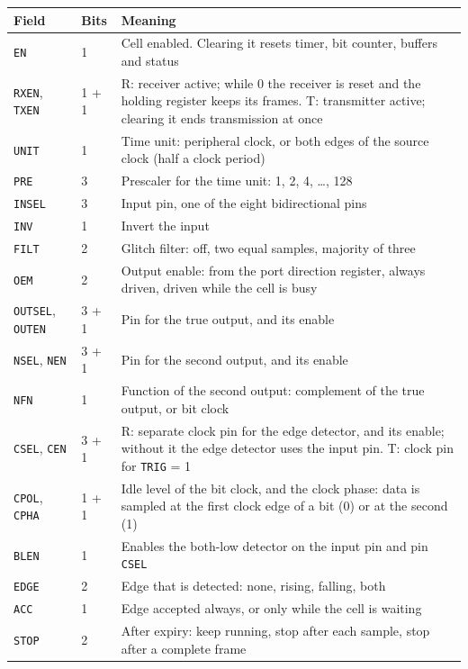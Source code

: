 \documentclass[10pt,a4paper]{article}
\newcommand{\reg}[1]{\texttt{#1}}
\begin{document}
\begin{table}[H]
\centering\small
\begin{tabularx}{\linewidth}{@{}llL@{}}
\toprule
Field & Bits & Meaning \\
\midrule
\reg{EN} & 1 & Cell enabled. Clearing it resets timer, bit counter, buffers and status \\
\reg{RXEN}, \reg{TXEN} & 1 + 1 & R: receiver active; while 0 the receiver is reset and the holding register keeps its frames. T: transmitter active; clearing it ends transmission at once \\
\reg{UNIT} & 1 & Time unit: peripheral clock, or both edges of the source clock (half a clock period) \\
\reg{PRE} & 3 & Prescaler for the time unit: 1, 2, 4, \dots, 128 \\
\midrule
\reg{INSEL} & 3 & Input pin, one of the eight bidirectional pins \\
\reg{INV} & 1 & Invert the input \\
\reg{FILT} & 2 & Glitch filter: off, two equal samples, majority of three \\
\reg{OEM} & 2 & Output enable: from the port direction register, always driven, driven while the cell is busy \\
\reg{OUTSEL}, \reg{OUTEN} & 3 + 1 & Pin for the true output, and its enable \\
\reg{NSEL}, \reg{NEN} & 3 + 1 & Pin for the second output, and its enable \\
\reg{NFN} & 1 & Function of the second output: complement of the true output, or bit clock \\
\reg{CSEL}, \reg{CEN} & 3 + 1 & R: separate clock pin for the edge detector, and its enable; without it the edge detector uses the input pin. T: clock pin for \reg{TRIG} = 1 \\
\reg{CPOL}, \reg{CPHA} & 1 + 1 & Idle level of the bit clock, and the clock phase: data is sampled at the first clock edge of a bit (0) or at the second (1) \\
\reg{BLEN} & 1 & Enables the both-low detector on the input pin and pin \reg{CSEL} \\
\midrule
\reg{EDGE} & 2 & Edge that is detected: none, rising, falling, both \\
\reg{ACC} & 1 & Edge accepted always, or only while the cell is waiting \\
\reg{STOP} & 2 & After expiry: keep running, stop after each sample, stop after a complete frame \\

\end{tabularx}
\end{table}
\end{document}

